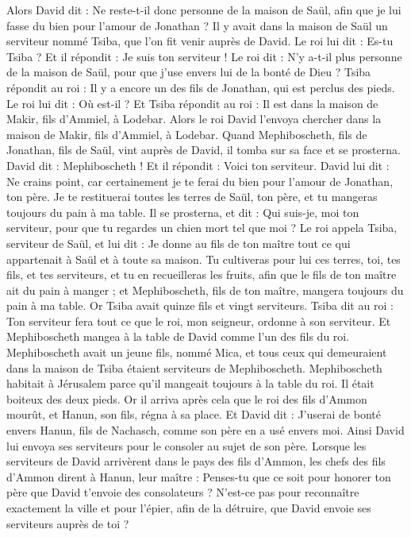 \begin{multicols}{2}
\VerseOne{}Alors David dit : Ne reste-t-il donc personne de la maison de Saül, afin que je lui fasse du bien pour l'amour de Jonathan ?
Il y avait dans la maison de Saül un serviteur nommé Tsiba, que l’on fit venir auprès de David. Le roi lui dit : Es-tu Tsiba ? Et il répondit : Je suis ton serviteur !
Le roi dit : N'y a-t-il plus personne de la maison de Saül, pour que j'use envers lui de la bonté de Dieu ? Tsiba répondit au roi : Il y a encore un des fils de Jonathan, qui est perclus des pieds.
Le roi lui dit : Où est-il ? Et Tsiba répondit au roi : Il est dans la maison de Makir, fils d’Ammiel, à Lodebar.
Alors le roi David l’envoya chercher dans la maison de Makir, fils d’Ammiel, à Lodebar.
Quand Mephiboscheth, fils de Jonathan, fils de Saül, vint auprès de David, il tomba sur sa face et se prosterna. David dit : Mephiboscheth ! Et il répondit : Voici ton serviteur.
David lui dit : Ne crains point, car certainement je te ferai du bien pour l’amour de Jonathan, ton père. Je te restituerai toutes les terres de Saül, ton père, et tu mangeras toujours du pain à ma table.
Il se prosterna, et dit : Qui suis-je, moi ton serviteur, pour que tu regardes un chien mort tel que moi ?
Le roi appela Tsiba, serviteur de Saül, et lui dit : Je donne au fils de ton maître tout ce qui appartenait à Saül et à toute sa maison.
Tu cultiveras pour lui ces terres, toi, tes fils, et tes serviteurs, et tu en recueilleras les fruits, afin que le fils de ton maître ait du pain à manger ; et Mephiboscheth, fils de ton maître, mangera toujours du pain à ma table. Or Tsiba avait quinze fils et vingt serviteurs.
Tsiba dit au roi : Ton serviteur fera tout ce que le roi, mon seigneur, ordonne à son serviteur. Et Mephiboscheth mangea à la table de David comme l'un des fils du roi.
Mephiboscheth avait un jeune fils, nommé Mica, et tous ceux qui demeuraient dans la maison de Tsiba étaient serviteurs de Mephiboscheth.
Mephiboscheth habitait à Jérusalem parce qu'il mangeait toujours à la table du roi. Il était boiteux des deux pieds.
\VerseOne{}Or il arriva après cela que le roi des fils d’Ammon mourût, et Hanun, son fils, régna à sa place.
Et David dit : J'userai de bonté envers Hanun, fils de Nachasch, comme son père en a usé envers moi. Ainsi David lui envoya ses serviteurs pour le consoler au sujet de son père. Lorsque les serviteurs de David arrivèrent dans le pays des fils d’Ammon,
les chefs des fils d’Ammon dirent à Hanun, leur maître : Penses-tu que ce soit pour honorer ton père que David t'envoie des consolateurs ? N'est-ce pas pour reconnaître exactement la ville et pour l’épier, afin de la détruire, que David envoie ses serviteurs auprès de toi ?

\end{multicols}
